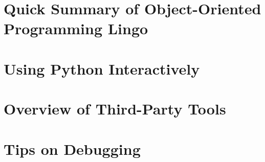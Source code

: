 \documentclass[oneside]{book}
\begin{document}
\chapter{Quick Summary of Object-Oriented Programming Lingo\label{appendix-lingo}}


\chapter{Using Python Interactively\label{appendix-interactivePython}}


\chapter{Overview of Third-Party Tools\label{appendix-thirdparty}}


\chapter{Tips on Debugging\label{appendix-debugging}}

\end{document}
